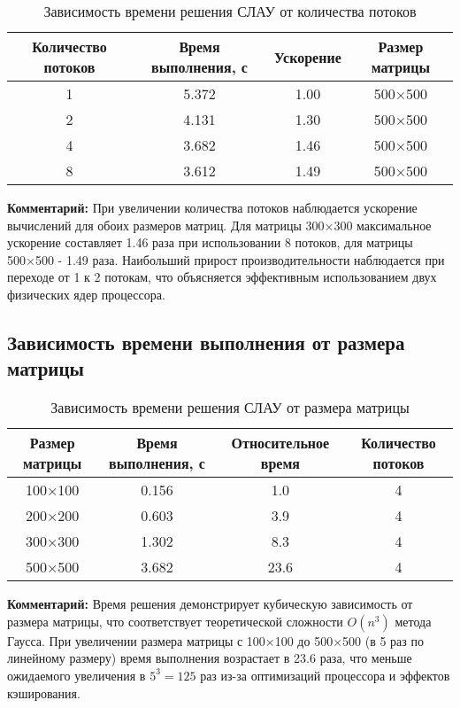 \begin{table}[h]
\centering
\begin{tabular}{|c|c|c|c|}
\hline
\textbf{Количество потоков} & \textbf{Время выполнения, с} & \textbf{Ускорение} & \textbf{Размер матрицы} \\
\hline
1 & 5.372 & 1.00 & 500×500 \\
2 & 4.131 & 1.30 & 500×500 \\
4 & 3.682 & 1.46 & 500×500 \\
8 & 3.612 & 1.49 & 500×500 \\
\hline
\end{tabular}
\caption{Зависимость времени решения СЛАУ от количества потоков}
\label{tab:threads_500}
\end{table}

\textbf{Комментарий:}
При увеличении количества потоков наблюдается ускорение вычислений для обоих размеров матриц. Для матрицы 300×300 максимальное ускорение составляет 1.46 раза при использовании 8 потоков, для матрицы 500×500 - 1.49 раза. Наибольший прирост производительности наблюдается при переходе от 1 к 2 потокам, что объясняется эффективным использованием двух физических ядер процессора.

\subsection{Зависимость времени выполнения от размера матрицы}

\begin{table}[h]
\centering
\begin{tabular}{|c|c|c|c|}
\hline
\textbf{Размер матрицы} & \textbf{Время выполнения, с} & \textbf{Относительное время} & \textbf{Количество потоков} \\
\hline
100×100 & 0.156 & 1.0 & 4 \\
200×200 & 0.603 & 3.9 & 4 \\
300×300 & 1.302 & 8.3 & 4 \\
500×500 & 3.682 & 23.6 & 4 \\
\hline
\end{tabular}
\caption{Зависимость времени решения СЛАУ от размера матрицы}
\label{tab:size}
\end{table}

\textbf{Комментарий:}
Время решения демонстрирует кубическую зависимость от размера матрицы, что соответствует теоретической сложности $O(n^3)$ метода Гаусса. При увеличении размера матрицы с 100×100 до 500×500 (в 5 раз по линейному размеру) время выполнения возрастает в 23.6 раза, что меньше ожидаемого увеличения в $5^3 = 125$ раз из-за оптимизаций процессора и эффектов кэширования.

